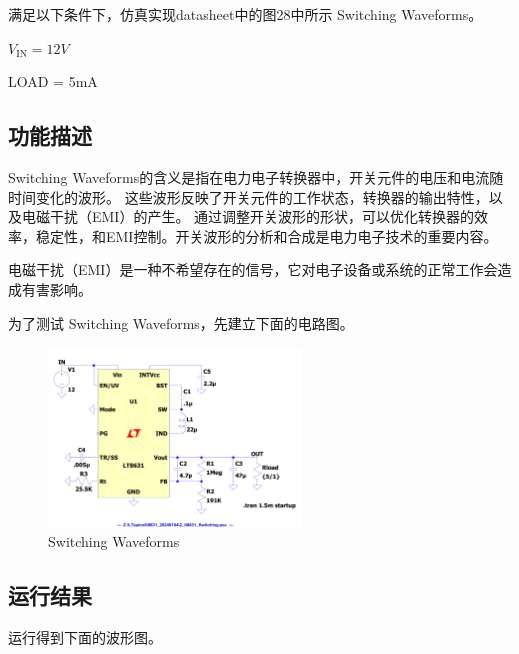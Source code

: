 \documentclass[lang=cn,10pt]{elegantbook}
\begin{document}
满足以下条件下，仿真实现datasheet中的图28中所示 Switching Waveforms。

$V_{\text{IN}} = 12V$

LOAD = 5mA

\subsection{功能描述}

Switching Waveforms的含义是指在电力电子转换器中，开关元件的电压和电流随时间变化的波形。
这些波形反映了开关元件的工作状态，转换器的输出特性，以及电磁干扰（EMI）的产生。
通过调整开关波形的形状，可以优化转换器的效率，稳定性，和EMI控制。开关波形的分析和合成是电力电子技术的重要内容。

电磁干扰（EMI）是一种不希望存在的信号，它对电子设备或系统的正常工作会造成有害影响。

为了测试 Switching Waveforms，先建立下面的电路图。

\begin{figure}[!htb]
    \centering\includegraphics[page=1, width=0.6\textwidth]{figure/2_lt8631_Switching_asc.pdf}
    \caption{Switching Waveforms}
\end{figure}

\subsection{运行结果}

运行得到下面的波形图。
\end{document}
